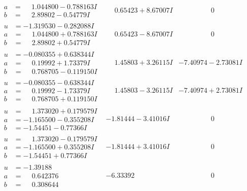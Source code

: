 \documentclass[1p]{elsarticle_modified}
\theoremstyle{definition}
\begin{document}
$$\begin{array}{c|c|c}
\begin{aligned}
a &= \phantom{-}1.044800 - 0.788163 I \\
b &= \phantom{-}2.89802 - 0.54779 I\end{aligned}
 & \phantom{-}0.65423 + 8.67007 I & \phantom{-0.000000 } 0 \\ \hline\begin{aligned}
u &= -1.319530 - 0.282088 I \\
a &= \phantom{-}1.044800 + 0.788163 I \\
b &= \phantom{-}2.89802 + 0.54779 I\end{aligned}
 & \phantom{-}0.65423 - 8.67007 I & \phantom{-0.000000 } 0 \\ \hline\begin{aligned}
u &= -0.080355 + 0.638344 I \\
a &= \phantom{-}0.19992 + 1.73379 I \\
b &= \phantom{-}0.768705 - 0.119150 I\end{aligned}
 & \phantom{-}1.45803 + 3.26115 I & -7.40974 - 2.73081 I \\ \hline\begin{aligned}
u &= -0.080355 - 0.638344 I \\
a &= \phantom{-}0.19992 - 1.73379 I \\
b &= \phantom{-}0.768705 + 0.119150 I\end{aligned}
 & \phantom{-}1.45803 - 3.26115 I & -7.40974 + 2.73081 I \\ \hline\begin{aligned}
u &= \phantom{-}1.373020 + 0.179579 I \\
a &= -1.165500 - 0.355208 I \\
b &= -1.54451 - 0.77366 I\end{aligned}
 & -1.81444 - 3.41016 I & \phantom{-0.000000 } 0 \\ \hline\begin{aligned}
u &= \phantom{-}1.373020 - 0.179579 I \\
a &= -1.165500 + 0.355208 I \\
b &= -1.54451 + 0.77366 I\end{aligned}
 & -1.81444 + 3.41016 I & \phantom{-0.000000 } 0 \\ \hline\begin{aligned}
u &= -1.39188\phantom{ +0.000000I} \\
a &= \phantom{-}0.642376\phantom{ +0.000000I} \\
b &= \phantom{-}0.308644\phantom{ +0.000000I}\end{aligned}
 & -6.33392\phantom{ +0.000000I} & \phantom{-0.000000 } 0 \\ \hline\begin{aligned}

\end{aligned}
\end{array}$$
\end{document}
